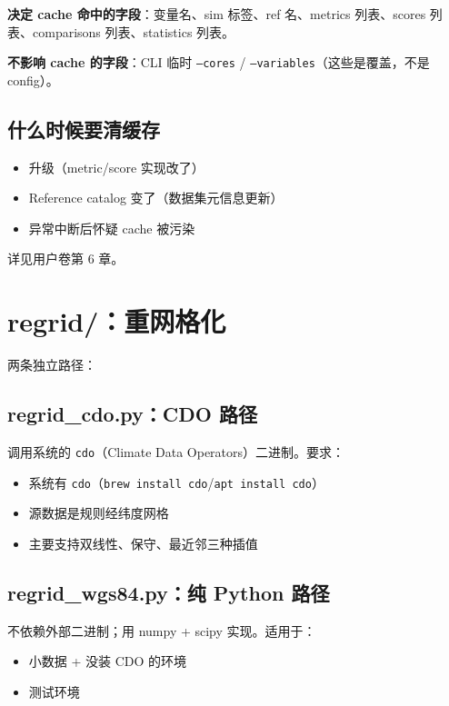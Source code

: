 \textbf{决定 cache 命中的字段}：变量名、sim 标签、ref 名、metrics 列表、scores 列表、comparisons 列表、statistics 列表。

\textbf{不影响 cache 的字段}：CLI 临时 \texttt{--cores} / \texttt{--variables}（这些是覆盖，不是 config）。

\subsection{什么时候要清缓存}

\begin{itemize}
  \item \openbench{} 升级（metric/score 实现改了）
  \item Reference catalog 变了（数据集元信息更新）
  \item 异常中断后怀疑 cache 被污染
\end{itemize}

详见用户卷第 6 章。

\section{regrid/：重网格化}

两条独立路径：

\subsection{regrid\_cdo.py：CDO 路径}

调用系统的 \texttt{cdo}（Climate Data Operators）二进制。要求：

\begin{itemize}
  \item 系统有 \texttt{cdo}（\texttt{brew install cdo}/\texttt{apt install cdo}）
  \item 源数据是规则经纬度网格
  \item 主要支持双线性、保守、最近邻三种插值
\end{itemize}

\subsection{regrid\_wgs84.py：纯 Python 路径}

不依赖外部二进制；用 numpy + scipy 实现。适用于：

\begin{itemize}
  \item 小数据 + 没装 CDO 的环境
  \item 测试环境
\end{itemize}

